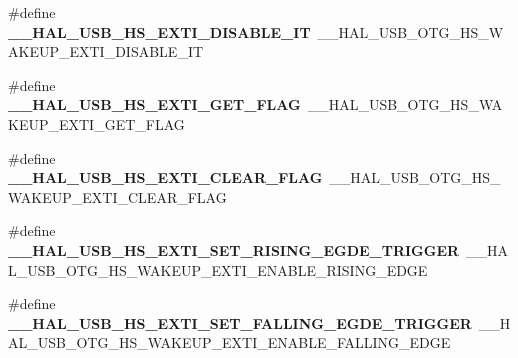 \begin{DoxyCompactItemize}
\item 
\hypertarget{group___h_a_l___u_s_b___aliased___macros_ga909208358d7e962ec3328278d80b0dfb}{\#define {\bfseries \-\_\-\-\_\-\-H\-A\-L\-\_\-\-U\-S\-B\-\_\-\-H\-S\-\_\-\-E\-X\-T\-I\-\_\-\-D\-I\-S\-A\-B\-L\-E\-\_\-\-I\-T}~\-\_\-\-\_\-\-H\-A\-L\-\_\-\-U\-S\-B\-\_\-\-O\-T\-G\-\_\-\-H\-S\-\_\-\-W\-A\-K\-E\-U\-P\-\_\-\-E\-X\-T\-I\-\_\-\-D\-I\-S\-A\-B\-L\-E\-\_\-\-I\-T}\label{group___h_a_l___u_s_b___aliased___macros_ga909208358d7e962ec3328278d80b0dfb}

\item 
\hypertarget{group___h_a_l___u_s_b___aliased___macros_ga025ca30b0d6182705d3a59af868ce771}{\#define {\bfseries \-\_\-\-\_\-\-H\-A\-L\-\_\-\-U\-S\-B\-\_\-\-H\-S\-\_\-\-E\-X\-T\-I\-\_\-\-G\-E\-T\-\_\-\-F\-L\-A\-G}~\-\_\-\-\_\-\-H\-A\-L\-\_\-\-U\-S\-B\-\_\-\-O\-T\-G\-\_\-\-H\-S\-\_\-\-W\-A\-K\-E\-U\-P\-\_\-\-E\-X\-T\-I\-\_\-\-G\-E\-T\-\_\-\-F\-L\-A\-G}\label{group___h_a_l___u_s_b___aliased___macros_ga025ca30b0d6182705d3a59af868ce771}

\item 
\hypertarget{group___h_a_l___u_s_b___aliased___macros_gae44d0cdfd6c4408c8fbfa1977e31bf4f}{\#define {\bfseries \-\_\-\-\_\-\-H\-A\-L\-\_\-\-U\-S\-B\-\_\-\-H\-S\-\_\-\-E\-X\-T\-I\-\_\-\-C\-L\-E\-A\-R\-\_\-\-F\-L\-A\-G}~\-\_\-\-\_\-\-H\-A\-L\-\_\-\-U\-S\-B\-\_\-\-O\-T\-G\-\_\-\-H\-S\-\_\-\-W\-A\-K\-E\-U\-P\-\_\-\-E\-X\-T\-I\-\_\-\-C\-L\-E\-A\-R\-\_\-\-F\-L\-A\-G}\label{group___h_a_l___u_s_b___aliased___macros_gae44d0cdfd6c4408c8fbfa1977e31bf4f}

\item 
\hypertarget{group___h_a_l___u_s_b___aliased___macros_ga146bc9a6b749f5745487f41bae1bff29}{\#define {\bfseries \-\_\-\-\_\-\-H\-A\-L\-\_\-\-U\-S\-B\-\_\-\-H\-S\-\_\-\-E\-X\-T\-I\-\_\-\-S\-E\-T\-\_\-\-R\-I\-S\-I\-N\-G\-\_\-\-E\-G\-D\-E\-\_\-\-T\-R\-I\-G\-G\-E\-R}~\-\_\-\-\_\-\-H\-A\-L\-\_\-\-U\-S\-B\-\_\-\-O\-T\-G\-\_\-\-H\-S\-\_\-\-W\-A\-K\-E\-U\-P\-\_\-\-E\-X\-T\-I\-\_\-\-E\-N\-A\-B\-L\-E\-\_\-\-R\-I\-S\-I\-N\-G\-\_\-\-E\-D\-G\-E}\label{group___h_a_l___u_s_b___aliased___macros_ga146bc9a6b749f5745487f41bae1bff29}

\item 
\hypertarget{group___h_a_l___u_s_b___aliased___macros_gaa70bce4e16d41ad8d3e0232b0c235c80}{\#define {\bfseries \-\_\-\-\_\-\-H\-A\-L\-\_\-\-U\-S\-B\-\_\-\-H\-S\-\_\-\-E\-X\-T\-I\-\_\-\-S\-E\-T\-\_\-\-F\-A\-L\-L\-I\-N\-G\-\_\-\-E\-G\-D\-E\-\_\-\-T\-R\-I\-G\-G\-E\-R}~\-\_\-\-\_\-\-H\-A\-L\-\_\-\-U\-S\-B\-\_\-\-O\-T\-G\-\_\-\-H\-S\-\_\-\-W\-A\-K\-E\-U\-P\-\_\-\-E\-X\-T\-I\-\_\-\-E\-N\-A\-B\-L\-E\-\_\-\-F\-A\-L\-L\-I\-N\-G\-\_\-\-E\-D\-G\-E}\label{group___h_a_l___u_s_b___aliased___macros_gaa70bce4e16d41ad8d3e0232b0c235c80}


\end{DoxyCompactItemize}
